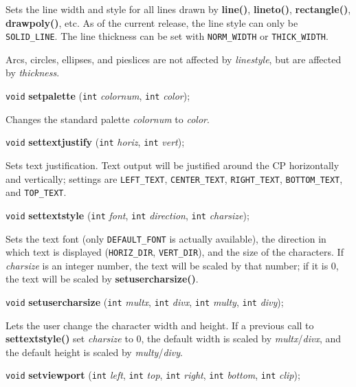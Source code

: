 \documentclass[a4paper,11pt]{article}
\newcommand{\V}{\texttt{void}}      %
\newcommand{\I}{\texttt{int}}       %
\newcommand{\func}[1]{\textbf{#1}}  %
\newcommand{\A}[1]{\emph{#1}}       %
\newcommand{\T}[1]{\texttt{#1}}     %
\newenvironment{bgi}
{ %
  \begin{snugshade}
}
{ %
  \end{snugshade}
}
\begin{document}
Sets the line width and style for all lines drawn by \func{line()},
\func{lineto()}, \func{rectangle()}, \func{drawpoly()}, etc. As of the
current release, the line style can only be \T{SOLID\_LINE}. The line
thickness can be set with \T{NORM\_WIDTH} or \T{THICK\-\_WIDTH}.

Arcs, circles, ellipses, and pieslices are not affected by
\A{linestyle}, but are affected by \A{thickness}.


\begin{bgi}
\V{} \func{setpalette} (\I{} \A{colornum}, \I{} \A{color}); 
\end{bgi}

Changes the standard palette \A{colornum} to \A{color}.


\begin{bgi}
\V{} \func{settextjustify} (\I{} \A{horiz}, \I{} \A{vert});
\end{bgi}

Sets text justification. Text output will be justified around the CP
horizontally and vertically; settings are \T{LEFT\_TEXT},
\T{CENTER\_TEXT}, \T{RIGHT\-\_TEXT}, \T{BOTTOM\_TEXT}, and
\T{TOP\_TEXT}.


\begin{bgi}
\V{} \func{settextstyle} (\I{} \A{font}, \I{} \A{direction}, \I{}
\A{charsize});
\end{bgi}

Sets the text font (only \T{DEFAULT\_FONT} is actually available), the
direction in which text is displayed (\T{HORIZ\_DIR}, \T{VERT\_DIR}),
and the size of the characters. If \A{charsize} is an integer number,
the text will be scaled by that number; if it is 0, the text will be
scaled by \func{setusercharsize()}.



\begin{bgi}
\V{} \func{setusercharsize} (\I{} \A{multx}, \I{} \A{divx}, \I{}
\A{multy}, \I{} \A{divy});
\end{bgi}

Lets the user change the character width and height. If a previous
call to \func{settextstyle()} set \A{charsize} to 0, the default width
is scaled by \A{multx}/\A{divx}, and the default height is scaled by
\A{multy}/\A{divy}.


\begin{bgi}
\V{} \func{setviewport} (\I{} \A{left}, \I{} \A{top}, \I{} \A{right},
\I{} \A{bottom}, \I{} \A{clip});
\end{bgi}
\end{document}
